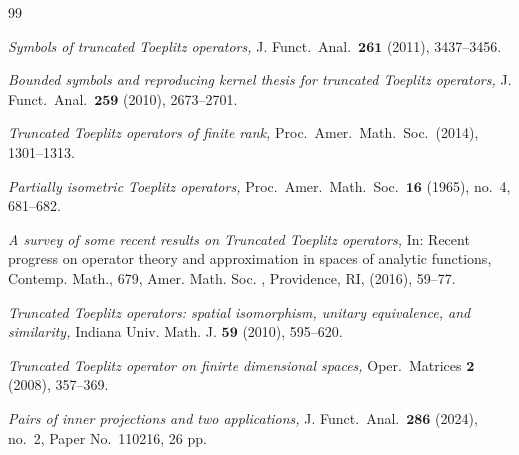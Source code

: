 \documentclass[12pt]{amsart}
\theoremstyle{definition}
\theoremstyle{plain}
\theoremstyle{definition}
\numberwithin{equation}{section}
\begin{document}
	
	

	
	
	
	
\label{Ref}
\begin{thebibliography}{99}
		
		{\it Symbols of truncated Toeplitz operators,}
		{J. Funct.\ Anal.\ $\bm{261}$ (2011), 3437--3456.}
		
		{\it Bounded symbols and reproducing kernel thesis for truncated Toeplitz operators,}
		{J. Funct.\ Anal.\ $\bm{259}$ (2010), 2673--2701.}
		
		{\it Truncated Toeplitz operators of finite rank,} 
		{Proc.\ Amer.\ Math.\ Soc.\ (2014), 1301--1313}.
		
		{\it Partially isometric Toeplitz operators,}
		{Proc.\ Amer.\ Math.\ Soc.\ $\bm{16}$ (1965), no.\ 4, 681--682.}
		
		
		{\it A survey of some recent results on Truncated Toeplitz operators,}
		{In: Recent progress on operator theory and approximation in spaces of analytic functions, Contemp. Math., 679, Amer. Math. Soc. , Providence, RI, (2016), 59--77}.
		
		
		{\it Truncated Toeplitz operators: spatial isomorphism, unitary equivalence, and similarity,}
		{Indiana Univ. Math. J. $\bm{59}$ (2010), 595--620.}
		
		{\it Truncated Toeplitz operator on finirte dimensional spaces,}
		{Oper.\ Matrices $\bm{2}$ (2008), 357--369.}
		
		{\it Pairs of inner projections and two applications,}
		{J. Funct.\ Anal.\ $\bm{286}$ (2024), no.~2, Paper No.\ 110216, 26 pp.}
		

\end{thebibliography}
\end{document}
